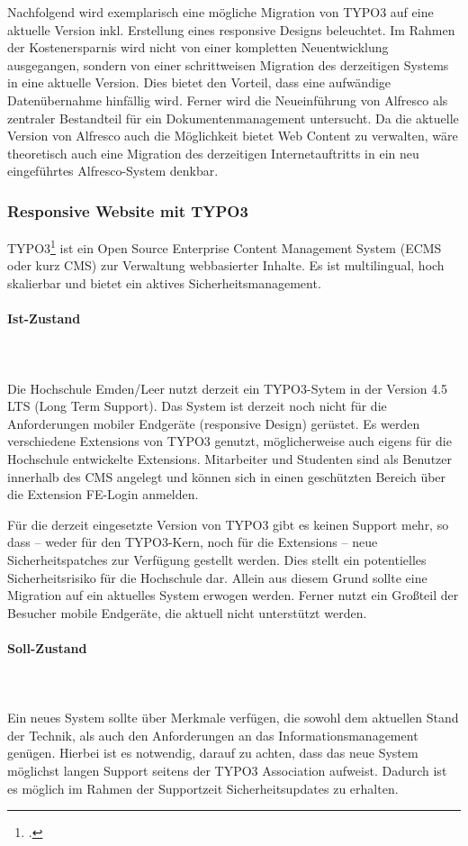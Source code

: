Nachfolgend wird exemplarisch eine mögliche Migration von TYPO3 auf eine aktuelle Version inkl. Erstellung eines responsive Designs beleuchtet. Im Rahmen der Kostenersparnis wird nicht von einer kompletten Neuentwicklung ausgegangen, sondern von einer schrittweisen Migration des derzeitigen Systems in eine aktuelle Version. Dies bietet den Vorteil, dass eine aufwändige Datenübernahme hinfällig wird. Ferner wird die Neueinführung von Alfresco als zentraler Bestandteil für ein Dokumentenmanagement untersucht. Da die aktuelle Version von Alfresco auch die Möglichkeit bietet Web Content zu verwalten, wäre theoretisch auch eine Migration des derzeitigen Internetauftritts in ein neu eingeführtes Alfresco-System denkbar.

\subsubsection{Responsive Website mit TYPO3}
TYPO3\footcite{typo3_overview_url} ist ein Open Source Enterprise Content Management System (ECMS oder kurz CMS) zur Verwaltung webbasierter Inhalte. Es ist multilingual, hoch skalierbar und bietet ein aktives Sicherheitsmanagement.

\paragraph{Ist-Zustand}\mbox{}\\\\
Die Hochschule Emden/Leer nutzt derzeit ein TYPO3-Sytem in der Version 4.5 LTS (Long Term Support). Das System ist derzeit noch nicht für die Anforderungen mobiler Endgeräte (responsive Design) gerüstet. Es werden verschiedene Extensions von TYPO3 genutzt, möglicherweise auch eigens für die Hochschule entwickelte Extensions. Mitarbeiter und Studenten sind als Benutzer innerhalb des CMS angelegt und können sich in einen geschützten Bereich über die Extension FE-Login anmelden.

Für die derzeit eingesetzte Version von TYPO3 gibt es keinen Support mehr, so dass – weder für den TYPO3-Kern, noch für die Extensions – neue Sicherheitspatches zur Verfügung gestellt werden. Dies stellt ein potentielles Sicherheitsrisiko für die Hochschule dar. Allein aus diesem Grund sollte eine Migration auf ein aktuelles System erwogen werden. Ferner nutzt ein Großteil der Besucher mobile Endgeräte, die aktuell nicht unterstützt werden.

\paragraph{Soll-Zustand}\mbox{}\\\\
Ein neues System sollte über Merkmale verfügen, die sowohl dem aktuellen Stand der Technik, als auch den Anforderungen an das Informationsmanagement genügen. Hierbei ist es notwendig, darauf zu achten, dass das neue System möglichst langen Support seitens der TYPO3 Association aufweist. Dadurch ist es möglich im Rahmen der Supportzeit Sicherheitsupdates zu erhalten. 

